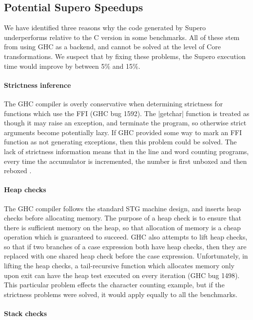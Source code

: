 \documentclass{llncs}
\begin{document}
\subsection{Potential Supero Speedups}

We have identified three reasons why the code generated by Supero underperforms relative to the C version in some benchmarks. All of these stem from using GHC as a backend, and cannot be solved at the level of Core transformations. We suspect that by fixing these problems, the Supero execution time would improve by between 5\% and 15\%.

\paragraph{Strictness inference}

The GHC compiler is overly conservative when determining strictness for functions which use the FFI (GHC bug 1592). The |getchar| function is treated as though it may raise an exception, and terminate the program, so otherwise strict arguments become potentially lazy. If GHC provided some way to mark an FFI function as not generating exceptions, then this problem could be solved. The lack of strictness information means that in the line and word counting programs, every time the accumulator is incremented, the number is first unboxed and then reboxed \cite{spj:unboxing}.

\paragraph{Heap checks}

The GHC compiler follows the standard STG machine \cite{spj:implementation} design, and inserts heap checks before allocating memory. The purpose of a heap check is to ensure that there is sufficient memory on the heap, so that allocation of memory is a cheap operation which is guaranteed to succeed. GHC also attempts to lift heap checks, so that if two branches of a case expression both have heap checks, then they are replaced with one shared heap check before the case expression. Unfortunately, in lifting the heap checks, a tail-recursive function which allocates memory only upon exit can have the heap test executed on every iteration (GHC bug 1498). This particular problem effects the character counting example, but if the strictness problems were solved, it would apply equally to all the benchmarks.

\paragraph{Stack checks}
\end{document}
